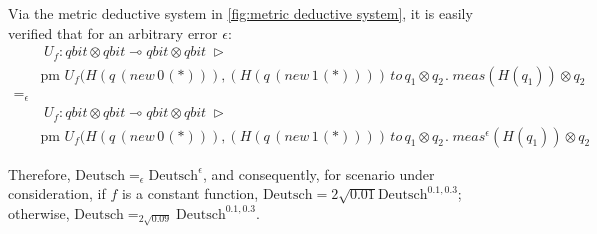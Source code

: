 Via the metric deductive system in \autoref{fig:metric deductive system}, it is easily verified that for an arbitrary error $\epsilon$:
\begin{align*}
   & \hspace{3pt} U_{f}: \textit{qbit} \otimes \textit{qbit} \multimap \textit{qbit} \otimes \textit{qbit} \hspace{3pt} \triangleright \hspace{3pt}  \\ 
  & \text{pm} \hspace{4pt}  U_{f}(H(q  \hspace{2pt}   ( \textit{new}   \hspace{2pt}  0 \hspace{1pt}(*))),(H(q  \hspace{2pt}   ( \textit{new}   \hspace{2pt}  1 \hspace{1pt}(*)))) \hspace{2pt}  \textit{to} \hspace{2pt} q_{1} \otimes q_{2} \hspace{1pt}. \hspace{3pt} \textit{meas} (H( q_{1})) \otimes q_{2} \\
  =_{\epsilon}& \\
   & \hspace{3pt} U_{f}: \textit{qbit} \otimes \textit{qbit} \multimap \textit{qbit} \otimes \textit{qbit} \hspace{3pt} \triangleright \hspace{3pt}  \\ 
  & \text{pm} \hspace{4pt}  U_{f}(H(q  \hspace{2pt}   ( \textit{new}   \hspace{2pt}  0 \hspace{1pt}(*))),(H(q  \hspace{2pt}   ( \textit{new}   \hspace{2pt}  1 \hspace{1pt}(*)))) \hspace{2pt}  \textit{to} \hspace{2pt} q_{1} \otimes q_{2} \hspace{1pt}. \hspace{3pt} \textit{meas}^{\epsilon} (H( q_{1})) \otimes q_{2}
   \end{align*}

Therefore, $\text{Deutsch}=_{\epsilon} \text{Deutsch}^{\epsilon}$, and consequently, for scenario under consideration, if $f$ is a constant function, $\text{Deutsch} ={2 \sqrt{0.01}} \text{Deutsch}^{0.1,0.3}$; otherwise, $\text{Deutsch} =_{2 \sqrt{0.09}} \text{Deutsch}^{0.1,0.3}$.


